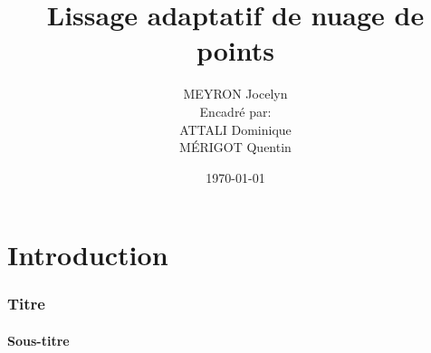 \documentclass{beamer}
\title[Lissage adaptatif de nuage de points]{Lissage adaptatif de nuage de
    points}
\author[MEYRON Jocelyn]{MEYRON Jocelyn\\\scriptsize{Encadré par:\\ATTALI Dominique\\MÉRIGOT
    Quentin}}
\institute{GIPSA-lab}
\date{\today}
\begin{document}
\begin{frame}
    \titlepage
\end{frame}

\begin{frame}
    \tableofcontents
\end{frame}

\section{Introduction}
\begin{frame}
    \frametitle{Titre}
    \framesubtitle{Sous-titre}
\end{frame}
\end{document}
